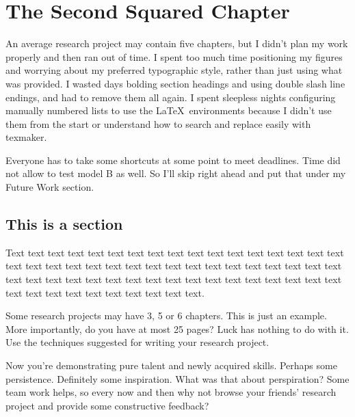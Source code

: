\chapter{The Second Squared Chapter}

An average research project may contain five chapters, but I didn't plan my work properly
and then ran out of time. I spent too much time positioning my figures and worrying
about my preferred typographic style, rather than just using what was provided.
I wasted days bolding section headings and using double slash line endings, and 
had to remove them all again. I spent sleepless nights configuring manually numbered lists
to use the \LaTeX\ environments because I didn't use them from the start or understand
how to search and replace easily with texmaker.

Everyone has to take some shortcuts
at some point to meet deadlines. Time did not allow to test model 
B as well. So I'll skip right ahead and put that under my Future Work section.


\section{This is a section} 
Text text text text text text text text text text text text text text
text text text text text text text text text text text text text text
text text text text text text text text text text text text text text
text text text text text text text text text text text text text text
text text text text text. 

Some research projects may have 3, 5 or 6 chapters. This is just an example. 
More importantly, do you have at most 25 pages?  
Luck has nothing to do with it. Use the techniques suggested for
writing your research project.

Now you're demonstrating pure talent and newly acquired skills. 
Perhaps some persistence. Definitely some inspiration. What was that about perspiration? 
Some team work helps, so every now and then why not browse your friends' research project and provide
some constructive feedback?
